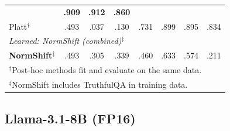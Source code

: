 \documentclass[11pt,a4paper]{article}
\begin{document}
\begin{table}[H]
\begin{tabular}{@{}lccccccc@{}}
                 & \textbf{.909} & \textbf{.912} & \textbf{.860} \\
Platt$^\dagger$          & .493 & .037 & .130 & .731
                 & .899 & .895 & .834 \\
\midrule
\multicolumn{8}{l}{\emph{Learned: NormShift (combined)$^\ddagger$}} \\
\textbf{NormShift}$^\ddagger$ & .493 & .305 & .339 & .460
                 & .633 & .574 & .211 \\
\bottomrule
\multicolumn{8}{l}{\scriptsize $^\dagger$Post-hoc methods fit and evaluate on the same data.} \\
\multicolumn{8}{l}{\scriptsize $^\ddagger$NormShift includes TruthfulQA in training data.}
\end{tabular}
\end{table}

\subsection{Llama-3.1-8B (FP16)}
\label{app:calibration-llama3.1-8b}
\end{document}
